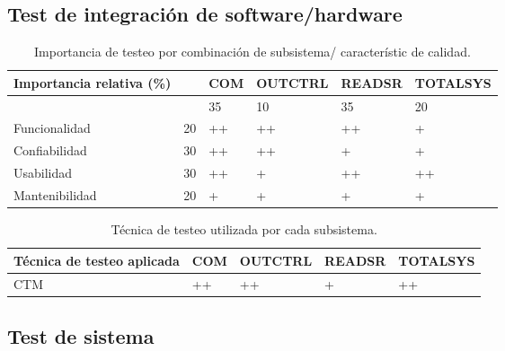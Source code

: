 \documentclass[12pt,a4paper, twosite]{article}
\begin{document}
\subsection{Test de integración de software/hardware}
\begin{table}[ht]
    \centering
    \begin{tabular}{|l|l|l|l|l|l|}\hline \hline
        Importancia relativa (\%) &    & COM & OUTCTRL & READSR & TOTALSYS \\
        \hline

                                  &    & 35  & 10      & 35     & 20       \\
        Funcionalidad             & 20 & ++  & ++      & ++     & +        \\
        Confiabilidad             & 30 & ++  & ++      & +      & +        \\
        Usabilidad                & 30 & ++  & +       & ++     & ++       \\
        Mantenibilidad            & 20 & +   & +       & +      & +        \\
        \hline
    \end{tabular}
    \caption{Importancia de testeo por combinación de subsistema/ característic
        de calidad.}
\end{table}

\begin{table}[ht]
    \centering
    \begin{tabular}{|l|l|l|l|l|}\hline \hline
        Técnica de testeo aplicada & COM & OUTCTRL & READSR & TOTALSYS \\
        \hline
        CTM                        & ++  & ++      & +      & ++       \\
        \hline
    \end{tabular}
    \caption{Técnica de testeo utilizada por cada subsistema.}
\end{table}

\subsection{Test de sistema}
\end{document}

